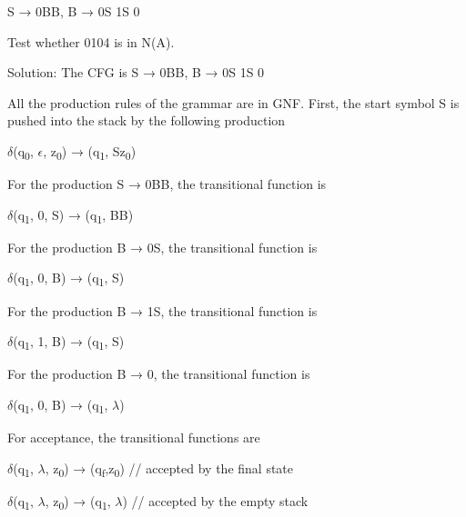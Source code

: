 \documentclass[]{article}
\begin{document}
\begin{center}
S → 0BB, B → 0S \textbar{} 1S \textbar{} 0
\end{center}

Test whether 0104 is in N(A).


Solution: The CFG is S → 0BB, B → 0S \textbar{} 1S \textbar{} 0

All the production rules of the grammar are in GNF.
First, the start symbol S is pushed into the stack by the following production

\begin{center}
$\delta$(q\textsubscript{0}, $\epsilon$, z\textsubscript{0}) → (q\textsubscript{1}, Sz\textsubscript{0})
\end{center}

For the production S → 0BB, the transitional function is

\begin{center}
$\delta$(q\textsubscript{1}, 0, S) → (q\textsubscript{1}, BB)
\end{center}

For the production B → 0S, the transitional function is

\begin{center}
$\delta$(q\textsubscript{1}, 0, B) → (q\textsubscript{1}, S)
\end{center}

For the production  B → 1S, the transitional function is

\begin{center}
$\delta$(q\textsubscript{1}, 1, B) → (q\textsubscript{1}, S)
\end{center}

For the production B → 0, the transitional function is

\begin{center}
$\delta$(q\textsubscript{1}, 0, B) → (q\textsubscript{1}, $\lambda$)
\end{center}

For acceptance, the transitional functions are

\begin{center}
$\delta$(q\textsubscript{1}, $\lambda$, z\textsubscript{0}) → (q\textsubscript{f},z\textsubscript{0}) // accepted by the final state
\end{center}

\begin{center}
$\delta$(q\textsubscript{1}, $\lambda$, z\textsubscript{0}) → (q\textsubscript{1}, $\lambda$) // accepted by the empty stack
\end{center}
\end{document}
